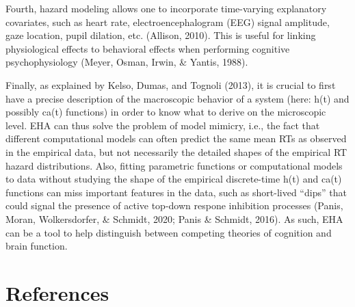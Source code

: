\documentclass[
  man,floatsintext]{apa6}
\begin{document}
Fourth, hazard modeling allows one to incorporate time-varying explanatory covariates, such as heart rate, electroencephalogram (EEG) signal amplitude, gaze location, pupil dilation, etc. (Allison, 2010). This is useful for linking physiological effects to behavioral effects when performing cognitive psychophysiology (Meyer, Osman, Irwin, \& Yantis, 1988).

Finally, as explained by Kelso, Dumas, and Tognoli (2013), it is crucial to first have a precise description of the macroscopic behavior of a system (here: h(t) and possibly ca(t) functions) in order to know what to derive on the microscopic level. EHA can thus solve the problem of model mimicry, i.e., the fact that different computational models can often predict the same mean RTs as observed in the empirical data, but not necessarily the detailed shapes of the empirical RT hazard distributions. Also, fitting parametric functions or computational models to data without studying the shape of the empirical discrete-time h(t) and ca(t) functions can miss important features in the data, such as short-lived ``dips'' that could signal the presence of active top-down respone inhibition processes (Panis, Moran, Wolkersdorfer, \& Schmidt, 2020; Panis \& Schmidt, 2016). As such, EHA can be a tool to help distinguish between competing theories of cognition and brain function.

\section*{References}\label{references}
\end{document}
